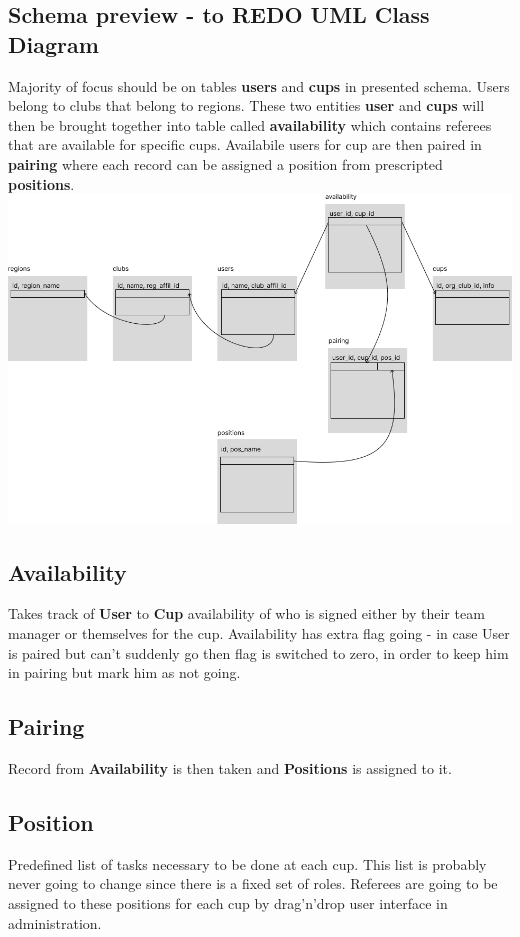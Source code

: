 \subsection*{Schema preview - to REDO UML Class Diagram}
Majority of focus should be on tables \textbf{users} and \textbf{cups} in presented schema. Users belong to clubs that belong to regions. These two entities \textbf{user} and \textbf{cups} will then be brought together into table called \textbf{availability} which contains referees that are available for specific cups. Availabile users for cup are then paired in \textbf{pairing} where each record can be assigned a position from prescripted \textbf{positions}.
\newline
\includegraphics[scale=0.430]{img/swimmpair_db_mockup.png}
\subsection*{Availability}
Takes track of \textbf{User} to \textbf{Cup} availability of who is signed either by their team manager or themselves for the cup. Availability has extra flag going - in case User is paired but can't suddenly go then flag is switched to zero, in order to keep him in pairing but mark him as not going.
\subsection*{Pairing}
Record from \textbf{Availability} is then taken and \textbf{Positions} is assigned to it. 
\subsection*{Position}
Predefined list of tasks necessary to be done at each cup. This list is probably never going to change since there is a fixed set of roles. Referees are going to be assigned to these positions for each cup by drag'n'drop user interface in administration.
\newpage
